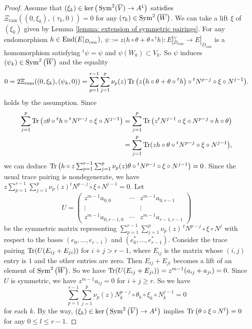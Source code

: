 \documentclass[pdftex]{sigma}
\numberwithin{equation}{section}
\newcommand{\Tr}{\mathop{\rm Tr}\nolimits}
\newcommand\End{\mathop{\rm End}\nolimits}
\newcommand{\Sym}{\mathop{\rm Sym}\nolimits}
\begin{document}
\begin{proof}
Assume that $(\xi_k)\in \ker\big(\Sym^2(\overline{V})\rightarrow A^1\big)$ satisfies
$\Xi_{\mathrm{ram}}((0,\xi_k),(\tau_k,0))=0$
for any $(\tau_k)\in \Sym^2\big(\overline{W}\big)$.
We can take a lift $\xi$ of $(\xi_k)$ given by Lemma \ref{lemma: extension of symmetric pairings}.
For any endomorphism $h\in \End(E|_{D_{\mathrm{ram}}})$,
$\psi:=z\big(h\circ\theta+\theta\circ {}^th\big)\colon E|_{D_{\mathrm{ram}}}^{\vee}\longrightarrow
E|_{D_{\mathrm{ram}}}$
is a homomorphism satisfying
$^t\psi=\psi$ and $\psi(W_k)\subset V_k$.
So $\psi$ induces $(\psi_k)\in \Sym^2\big(\overline{W}\big)$ and the equality
\[
 0=2\Xi_{\mathrm{ram}}((0,\xi_k),(\psi_k,0))=
 \sum_{p=1}^{r-1}\sum_{j=1}^p
 \nu_p(z)\Tr\big(
 z\big(h\circ\theta+\theta\circ{}^th\big)\circ{}^tN^{p-j}\circ\xi\circ N^{j-1}\big).
\]
holds by the assumption.
Since
\begin{align*}
 \sum_{j=1}^p \Tr\big(z \theta\circ{}^th\circ{}^tN^{p-j}\circ\xi\circ N^{j-1}\big)
 &=
 \sum_{j=1}^p \Tr\big(z {}^tN^{j-1}\circ\xi\circ N^{p-j}\circ h\circ\theta\big)
 \\
 &=\sum_{j=1}^p \Tr (z h\circ\theta\circ{}^tN^{p-j}\circ\xi\circ N^{j-1}\big),
\end{align*}
we can deduce
$\Tr\big( h\circ z\sum_{p=1}^{r-1}\sum_{j=1}^p
\nu_p(z) \theta\circ{}^tN^{p-j}\circ\xi\circ N^{j-1}\big)=0$.
Since the usual trace pairing is nondegenerate, we have
$z\sum_{p=1}^{r-1}\sum_{j=1}^p
\nu_p(z) {}^tN^{p-j}\circ\xi\circ N^{j-1}=0$.
Let
\[
 U=\begin{pmatrix}
 z^{m-1}a_{0,0} & \cdots & z^{m-1}a_{0,r-1} \\
 \vdots & & \vdots \\
 z^{m-1}a_{0,r-1,0} & \cdots & z^{m-1}a_{r-1,r-1}
 \end{pmatrix}
\]
be the symmetric matrix representing
$\sum_{p=1}^{r-1}\sum_{j=1}^p
\nu_p(z) \,^tN^{p-j}\circ\xi\circ N^j$
with respect to the bases $(e_0,\dots,e_{r-1})$ and $(e^*_0,\dots,e^*_{r-1})$.
Consider the trace pairing $\Tr(U(E_{ij}+E_{ji}))$
for $i+j>r-1$,
where $E_{ij}$ is the matrix whose $(i,j)$ entry is $1$ and the other entries are zero.
Then $E_{ij}+E_{ji}$ becomes a lift of an element of $\Sym^2\big(\overline{W}\big)$.
So we have
$\Tr(U(E_{ij}+E_{ji}))=z^{m-1}(a_{ij}+a_{ji})=0$.
Since $U$ is symmetric, we have $z^{m-1}a_{ij}=0$ for $i+j\geq r$.
So we have
\[
\sum_{p=1}^{r-1}\sum_{j=1}^p \nu_p(z) N_k^{p-j}\circ\theta_k\circ\xi_k\circ N_k^{j-1}=0
\]
for each $k$.
By the way, $(\xi_k)\in\ker\big(\Sym^2\big(\overline{V}\big)\rightarrow A^1\big)$ implies
$\Tr\big(\theta\circ\xi\circ N^l\big)=0$ for any $0\leq l\leq r-1$.

\end{proof}
\end{document}
